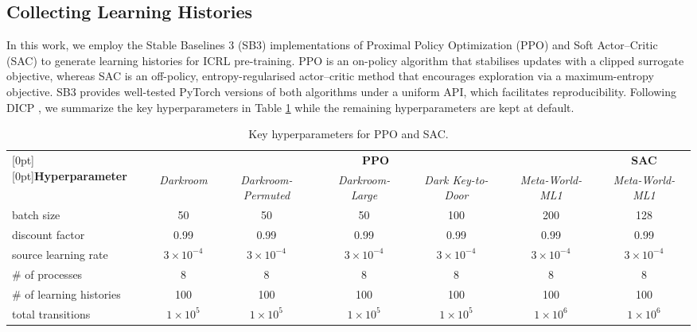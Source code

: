 \documentclass{article}
\begin{document}
\subsection{Collecting Learning Histories}
\label{append_collect_history}
In this work, we employ the Stable Baselines 3 (SB3) implementations of Proximal Policy Optimization (PPO) \citep{schulman2017proximal} and Soft Actor–Critic (SAC) \citep{haarnoja2018soft} to generate learning histories for ICRL pre-training. PPO is an on-policy algorithm that stabilises updates with a clipped surrogate objective, whereas SAC is an off-policy, entropy-regularised actor–critic method that encourages exploration via a maximum-entropy objective. SB3 provides well-tested PyTorch versions of both algorithms under a uniform API, which facilitates reproducibility.
Following DICP \cite{son2025distilling}, we summarize the key hyperparameters in Table \ref{tab:hyp-ppo-sac} while the remaining hyperparameters are kept at default.
\newcommand{\adjvcenter}[1]{
  \raisebox{-.55\height}[0pt][0pt]{#1}
}
\begin{table}[h]
\caption{Key hyperparameters for PPO and SAC.}
\label{tab:hyp-ppo-sac}
\scriptsize
\centering
\setlength{\tabcolsep}{3pt}
\begin{tabular}{l c c c c c c}
\toprule
\multirow{2}{*}{\adjvcenter{\textbf{Hyperparameter}}} &
\multicolumn{5}{c}{\textbf{PPO}} & \textbf{SAC}\\
\cmidrule(lr){2-6}\cmidrule(lr){7-7}
& \textit{Darkroom} & \textit{Darkroom-Permuted} &
  \textit{Darkroom-Large} & \textit{Dark Key-to-Door} &
  \textit{Meta-World-ML1} & \textit{Meta-World-ML1}\\
\midrule
batch size              & 50  & 50  & 50  & 100 & 200 & 128\\
discount factor         & 0.99& 0.99& 0.99& 0.99& 0.99& 0.99\\
source learning rate    & $3\times10^{-4}$ & $3\times10^{-4}$ &
                          $3\times10^{-4}$ & $3\times10^{-4}$ &
                          $3\times10^{-4}$ & $3\times10^{-4}$\\
\# of processes         & 8   & 8   & 8   & 8   & 8   & 8\\
\# of learning histories& 100 & 100 & 100 & 100 & 100 & 100\\
total transitions       & $1\times10^{5}$ & $1\times10^{5}$ & $1\times10^{5}$ &
                          $1\times10^{5}$ & $1\times10^{6}$ & $1\times10^{6}$\\
\bottomrule
\end{tabular}
\end{table}
\end{document}
